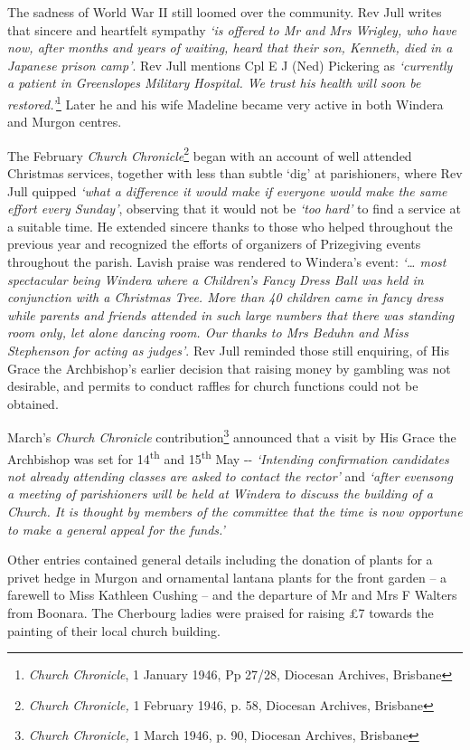 The sadness of World War II still loomed over the community. Rev Jull writes that sincere and heartfelt sympathy \emph{`is offered to Mr and Mrs Wrigley, who have now, after months and years of waiting, heard that their son, Kenneth, died in a Japanese prison camp'}. Rev Jull mentions Cpl E J (Ned) Pickering as \emph{`currently a patient in Greenslopes Military Hospital. We trust his health will soon be restored.'}\footnote{\emph{Church Chronicle}, 1 January 1946, Pp 27/28, Diocesan Archives, Brisbane} Later he and his wife Madeline became very active in both Windera and Murgon centres.


The February \emph{Church Chronicle}\footnote{\emph{Church Chronicle,} 1 February 1946, p. 58, Diocesan Archives, Brisbane} began with an account of well attended Christmas services, together with less than subtle `dig' at parishioners, where Rev Jull quipped \emph{`what a difference it would make if everyone would make the same effort every Sunday'}, observing that it would not be \emph{`too hard'} to find a service at a suitable time. He extended sincere thanks to those who helped throughout the previous year and recognized the efforts of organizers of Prizegiving events throughout the parish. Lavish praise was rendered to Windera's event: \emph{`\ldots{} most spectacular being Windera where a Children's Fancy Dress Ball was held in conjunction with a Christmas Tree. More than 40 children came in fancy dress while parents and friends attended in such large numbers that there was standing room only, let alone dancing room. Our thanks to Mrs Beduhn and Miss Stephenson for acting as judges'}. Rev Jull reminded those still enquiring, of His Grace the Archbishop's earlier decision that raising money by gambling was not desirable, and permits to conduct raffles for church functions could not be obtained.


March's \emph{Church Chronicle} contribution\footnote{\emph{Church Chronicle,} 1 March 1946, p. 90, Diocesan Archives, Brisbane} announced that a visit by His Grace the Archbishop was set for 14\textsuperscript{th} and 15\textsuperscript{th} May -\/- \emph{`Intending confirmation candidates not already attending classes are asked to contact the rector'} and \emph{`after evensong a meeting of parishioners will be held at Windera to discuss the building of a Church. It is thought by members of the committee that the time is now opportune to make a general appeal for the funds.'}


Other entries contained general details including the donation of plants for a privet hedge in Murgon and ornamental lantana plants for the front garden -- a farewell to Miss Kathleen Cushing -- and the departure of Mr and Mrs F Walters from Boonara. The Cherbourg ladies were praised for raising \pounds7 towards the painting of their local church building.



